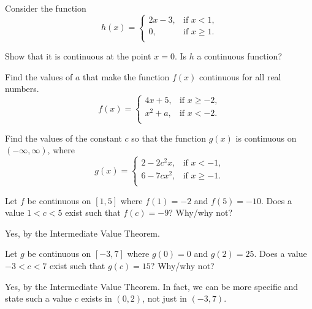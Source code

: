 \begin{enumialphparenastyle}
\begin{ex}
\end{ex}



\begin{ex} 
Consider the function 
$$h(x) = \left\{
\begin{array}{rl}
2x-3, & \mbox{if $x<1$,}\\
0, & \mbox{if $x\geq 1$.}\\
\end{array}\right.$$

Show that it is continuous at the point $x=0$.  Is $h$ a continuous function?
\end{ex}

\begin{ex} 
Find the values of $a$ that make the function $f(x)$ continuous for all real numbers.
$$f(x) = \left\{
\begin{array}{rl}
4x+5, & \mbox{if $x\geq -2$,}\\
x^2+a, & \mbox{if $x<-2$.}\\
\end{array}\right.$$
\end{ex}

\begin{ex} 
Find the values of the constant $c$ so that the function $g(x)$ is continuous on $(-\infty,\infty)$, where
$$g(x) = \left\{
\begin{array}{rl}
2-2c^2x, & \mbox{if $x<-1$,}\\
6-7cx^2, & \mbox{if $x\geq-1$.}\\
\end{array}\right.$$
\end{ex}


\begin{ex}
 
{Let $f$ be continuous on $[1,5]$ where $f(1) = -2$ and $f(5) = -10$. Does a value $1<c<5$ exist such that $f(c) = -9$? Why/why not?
}

\begin{sol}
{Yes, by the Intermediate Value Theorem.
} 
\end{sol}

\end{ex}
\begin{ex}
 {Let $g$ be continuous on $[-3,7]$ where $g(0) = 0$ and $g(2) = 25$. Does a value $-3<c<7$ exist such that $g(c) = 15$? Why/why not?
 }


\begin{sol}
  {Yes, by the Intermediate Value Theorem. In fact, we can be more specific and state such a value $c$ exists in $(0,2)$, not just in $(-3,7)$.
  }
\end{sol}


\end{ex}
\end{enumialphparenastyle}
